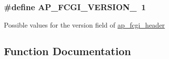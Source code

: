 \subsubsection[{\texorpdfstring{A\+P\+\_\+\+F\+C\+G\+I\+\_\+\+V\+E\+R\+S\+I\+O\+N\+\_\+1}{AP_FCGI_VERSION_1}}]{\setlength{\rightskip}{0pt plus 5cm}\#define A\+P\+\_\+\+F\+C\+G\+I\+\_\+\+V\+E\+R\+S\+I\+O\+N\+\_~1}\hypertarget{group__APACHE__CORE__FASTCGI_ga3fbe95d766d824207ef4c833dcc7c5bf}{}\label{group__APACHE__CORE__FASTCGI_ga3fbe95d766d824207ef4c833dcc7c5bf}
Possible values for the version field of \hyperlink{structap__fcgi__header}{ap\+\_\+fcgi\+\_\+header} 

\subsection{Function Documentation}
